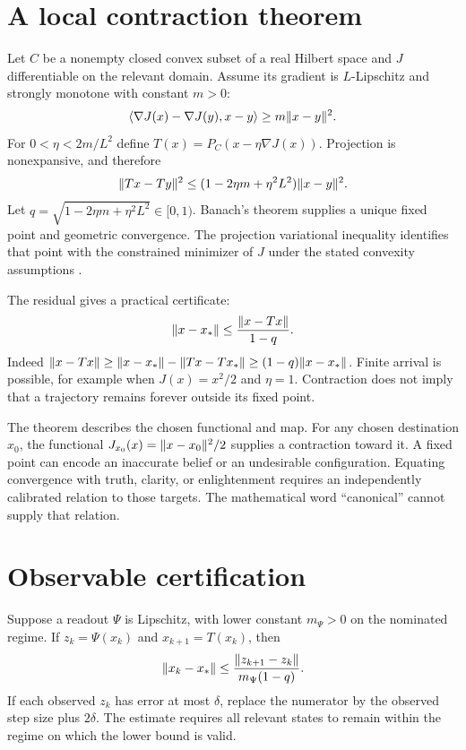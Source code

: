 \section{A local contraction theorem}\label{section:cscf:a-local-contraction-theorem}
Let $C$ be a nonempty closed convex subset of a real Hilbert space and $J$ differentiable on the relevant domain. Assume its gradient is $L$-Lipschitz and strongly monotone with constant $m>0$:
\[
\langle \nabla J(x)-\nabla J(y),x-y\rangle\ge m\lVert x-y\rVert^2.
\]
For $0<\eta<2m/L^2$ define $T(x)=P_C(x-\eta\nabla J(x))$. Projection is nonexpansive, and therefore
\[
\lVert Tx-Ty\rVert^2\le
(1-2\eta m+\eta^2L^2)\lVert x-y\rVert^2.
\]
Let $q=\sqrt{1-2\eta m+\eta^2L^2}\in[0,1)$. Banach's theorem supplies a unique fixed point and geometric convergence. The projection variational inequality identifies that point with the constrained minimizer of $J$ under the stated convexity assumptions \cite{RodgersField}.

The residual gives a practical certificate:
\begin{equation}\label{eq:fixedres}
\lVert x-x_*\rVert\le\frac{\lVert x-Tx\rVert}{1-q}.
\end{equation}
Indeed $\lVert x-Tx\rVert\ge\lVert x-x_*\rVert-\lVert Tx-Tx_*\rVert\ge(1-q)\lVert x-x_*\rVert$. Finite arrival is possible, for example when $J(x)=x^2/2$ and $\eta=1$. Contraction does not imply that a trajectory remains forever outside its fixed point.

The theorem describes the chosen functional and map. For any chosen destination $x_0$, the functional $J_{x_0}(x)=\lVert x-x_0\rVert^2/2$ supplies a contraction toward it. A fixed point can encode an inaccurate belief or an undesirable configuration. Equating convergence with truth, clarity, or enlightenment requires an independently calibrated relation to those targets. The mathematical word ``canonical'' cannot supply that relation.

\section{Observable certification}\label{section:cscf:observable-certification}
Suppose a readout $\Psi$ is Lipschitz, with lower constant $m_\Psi>0$ on the nominated regime. If $z_k=\Psi(x_k)$ and $x_{k+1}=T(x_k)$, then
\[
\lVert x_k-x_*\rVert\le
\frac{\lVert z_{k+1}-z_k\rVert}{m_\Psi(1-q)}.
\]
If each observed $z_k$ has error at most $\delta$, replace the numerator by the observed step size plus $2\delta$. The estimate requires all relevant states to remain within the regime on which the lower bound is valid.

